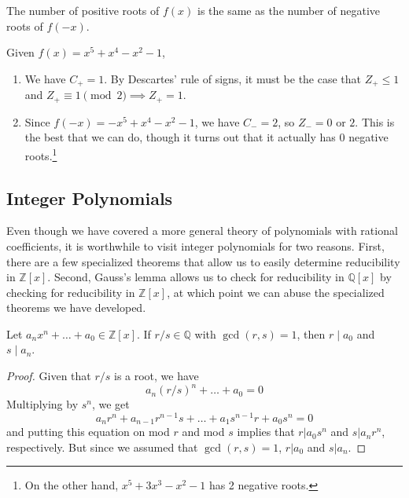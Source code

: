   \begin{theorem}
    The number of positive roots of $f(x)$ is the same as the number of negative roots of $f(-x)$.
  \end{theorem}

  \begin{example}
    Given $f(x) = x^5 + x^4 - x^2 - 1$, 
    \begin{enumerate}
      \item We have $C_+ = 1$. By Descartes' rule of signs, it must be the case that $Z_+ \leq 1$ and $Z_+ \equiv 1 \pmod{2} \implies Z_+ = 1$. 
      \item Since $f(-x) = -x^5 + x^4 - x^2 - 1$, we have $C_- = 2$, so $Z_- = 0$ or $2$. This is the best that we can do, though it turns out that it actually has $0$ negative roots.\footnote{On the other hand, $x^5 + 3x^3 - x^2 - 1$ has 2 negative roots.} 
    \end{enumerate}
  \end{example}

\subsection{Integer Polynomials} 

  Even though we have covered a more general theory of polynomials with rational coefficients, it is worthwhile to visit integer polynomials for two reasons. First, there are a few specialized theorems that allow us to easily determine reducibility in $\mathbb{Z}[x]$. Second, Gauss's lemma allows us to check for reducibility in $\mathbb{Q}[x]$ by checking for reducibility in $\mathbb{Z}[x]$, at which point we can abuse the specialized theorems we have developed. 

  \begin{theorem}
    Let $a_n x^n + \ldots + a_0 \in \mathbb{Z}[x]$. If $r/s \in \mathbb{Q}$ with $\gcd(r, s) = 1$, then $r \mid a_0$ and $s \mid a_n$. 
  \end{theorem}
  \begin{proof}
    Given that $r/s$ is a root, we have 
    \begin{equation}
      a_n (r/s)^n + \ldots + a_0 = 0
    \end{equation}
    Multiplying by $s^n$, we get 
    \begin{equation}
      a_n r^n + a_{n-1} r^{n-1} s + \ldots + a_1 s^{n-1} r + a_0 s^n = 0
    \end{equation}
    and putting this equation on mod $r$ and mod $s$ implies that $r | a_0 s^n$ and $s | a_n r^n$, respectively. But since we assumed that $\gcd (r, s) = 1$, $r | a_0$ and $s | a_n$. 
  \end{proof}

